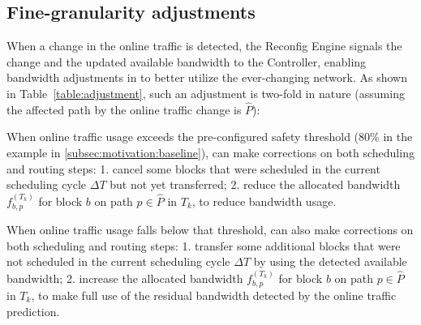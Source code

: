 {\subsection{Fine-granularity adjustments}
\label{subsec:dynamic:incremental}
When a change in the online traffic is detected, the Reconfig Engine signals the change and the updated available bandwidth to the Controller, enabling bandwidth adjustments in \newname to better utilize the ever-changing network. As shown in Table~\ref{table:adjustment}, such an adjustment is two-fold in nature (assuming the affected path by the online traffic change is $\hat{P}$):

\begin{table}[t]
\begin{center}
\end{center}
\label{table:adjustment}
\vspace{-0.4cm}
\end{table}

\begin{packeditemize}
\item When online traffic usage exceeds the pre-configured safety threshold (80\% in the example in \Section\ref{subsec:motivation:baseline}), \newname can make corrections on both scheduling and routing steps: 1. cancel some blocks that were scheduled in the current scheduling cycle $\Delta T$ but not yet transferred; 2. reduce the allocated bandwidth $f_{b,p}^{(T_k)}$ for block $b$ on path $p\in \hat{P}$ in $T_k$, to reduce bandwidth usage.

\item When online traffic usage falls below that threshold, \newname can also make corrections on both scheduling and routing steps: 1. transfer some additional blocks that were not scheduled in the current scheduling cycle $\Delta T$ by using the detected available bandwidth; 2. increase the allocated bandwidth $f_{b,p}^{(T_k)}$ for block $b$ on path $p\in \hat{P}$ in $T_k$, to make full use of the residual bandwidth detected by the online traffic prediction.
\end{packeditemize}

}
